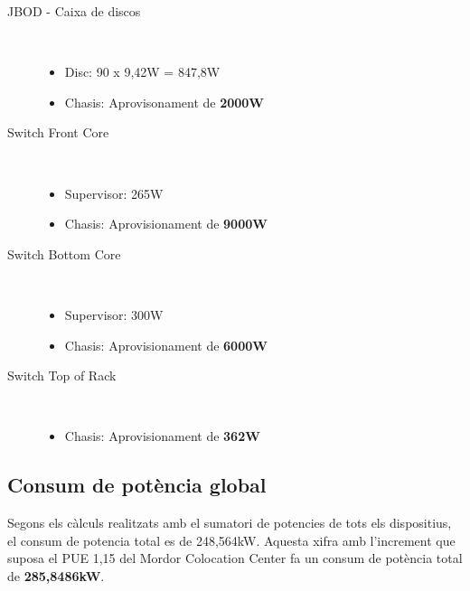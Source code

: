 \begin{description}
    \item[JBOD - Caixa de discos] \hfill \\
        \vspace{-5mm}
        \begin{itemize}[leftmargin=*]
            \item Disc: 90 x 9,42W = 847,8W
            \item Chasis: Aprovisonament de \textbf{2000W}
        \end{itemize}
        
    \item[Switch Front Core] \hfill \\
        \vspace{-5mm}
        \begin{itemize}[leftmargin=*]
            \item Supervisor: 265W
            \item Chasis: Aprovisionament de \textbf{9000W}
        \end{itemize}
        
    \item[Switch Bottom Core] \hfill \\
        \vspace{-5mm}
        \begin{itemize}[leftmargin=*]
            \item Supervisor: 300W
            \item Chasis: Aprovisionament de \textbf{6000W}
        \end{itemize}
        
    \item[Switch Top of Rack] \hfill \\
        \vspace{-5mm}
        \begin{itemize}[leftmargin=*]
            \item Chasis: Aprovisionament de \textbf{362W}
        \end{itemize}
        
\end{description}

\subsection{Consum de potència global}

Segons els càlculs realitzats amb el sumatori de potencies de tots els dispositius, el consum de potencia total es de 248,564kW. Aquesta xifra amb l'increment que suposa el PUE 1,15 del Mordor Colocation Center fa un consum de potència total de \textbf{285,8486kW}.


